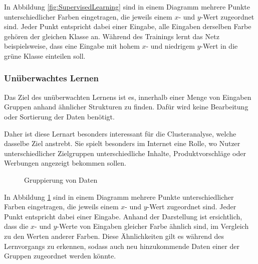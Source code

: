 \documentclass[12pt,a4]{article}
\begin{document}
In Abbildung \ref{fig:SupervisedLearning} sind in einem Diagramm mehrere Punkte unterschiedlicher Farben eingetragen, die jeweils einem $x$- und $y$-Wert zugeordnet sind. Jeder Punkt entspricht dabei einer Eingabe, alle Eingaben derselben Farbe gehören der gleichen Klasse an. Während des Trainings lernt das Netz beispielsweise, dass eine Eingabe mit hohem $x$- und niedrigem $y$-Wert in die grüne Klasse einteilen soll.

\subsubsection{Unüberwachtes Lernen}\label{sec:UnsupervisedLearning}
Das Ziel des unüberwachten Lernens ist es, innerhalb einer Menge von Eingaben Gruppen anhand ähnlicher Strukturen zu finden. Dafür wird keine Bearbeitung oder Sortierung der Daten benötigt.

Daher ist diese Lernart besonders interessant für die Clusteranalyse, welche dasselbe Ziel anstrebt. Sie spielt besonders im Internet eine Rolle, wo Nutzer unterschiedlicher Zielgruppen unterschiedliche Inhalte, Produktvorschläge oder Werbungen angezeigt bekommen sollen.

\begin{figure}[!h]
\centering
{}
\caption{Gruppierung von Daten}
\label{fig:UnsupervisedLearning}
\end{figure}

In Abbildung \ref{fig:UnsupervisedLearning} sind in einem Diagramm mehrere Punkte unterschiedlicher Farben eingetragen, die jeweils einem $x$- und $y$-Wert zugeordnet sind. Jeder Punkt entspricht dabei einer Eingabe. Anhand der Darstellung ist ersichtlich, dass die $x$- und $y$-Werte von Eingaben gleicher Farbe ähnlich sind, im Vergleich zu den Werten anderer Farben. Diese Ähnlichkeiten gilt es während des Lernvorgangs zu erkennen, sodass auch neu hinzukommende Daten einer der Gruppen zugeordnet werden könnte.
\end{document}
